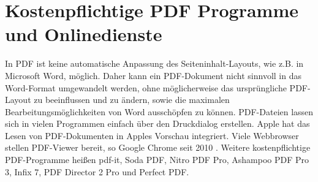 \section{Kostenpflichtige PDF Programme und Onlinedienste}
In PDF ist keine automatische Anpassung des Seiteninhalt-Layouts, wie z.B. in Microsoft Word, möglich. Daher kann ein PDF-Dokument nicht sinnvoll in das Word-Format umgewandelt werden, ohne möglicherweise das ursprüngliche PDF-Layout zu beeinflussen und zu ändern, sowie die maximalen Bearbeitungsmöglichkeiten von Word ausschöpfen zu können. PDF-Dateien lassen sich in vielen Programmen einfach über den Druckdialog erstellen. Apple hat das Lesen von PDF-Dokumenten in Apples Vorschau integriert. Viele Webbrowser stellen PDF-Viewer bereit, so Google Chrome seit 2010 \cite{wiki-pdf-de}. Weitere kostenpflichtige PDF-Programme heißen pdf-it, Soda PDF, Nitro PDF Pro, Ashampoo PDF Pro 3, Infix 7, PDF Director 2 Pro und Perfect PDF.

